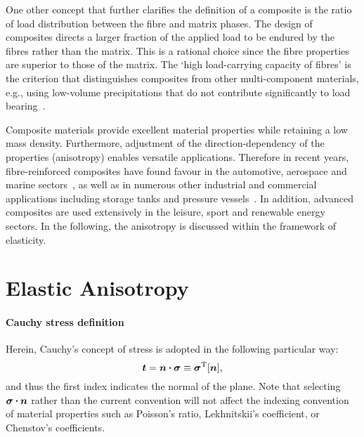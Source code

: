 	One other concept that further clarifies the definition of a composite is the ratio of load distribution between the fibre and matrix phases. The design of composites directs a larger fraction of the applied load to be endured by the fibres rather than the matrix. This is a rational choice since the fibre properties are superior to those of the matrix. The `high load-carrying capacity of fibres' is the criterion that distinguishes composites from other multi-component materials, e.g., using low-volume precipitations that do not contribute significantly to load bearing~\autocite{Clyne.2019}.
		
	Composite materials provide excellent material properties while retaining a low mass density. Furthermore, adjustment of the direction-dependency of the properties (anisotropy) enables versatile applications. Therefore in recent years, fibre-reinforced composites have found favour in the automotive, aerospace and marine sectors~\autocite{Jones.1999}, as well as in numerous other industrial and commercial applications including storage tanks and pressure vessels~\autocite{Vasiliev.2013}. In addition, advanced composites are used extensively in the leisure, sport and renewable energy sectors. In the following, the anisotropy is discussed within the framework of elasticity.


\bl
\section{Elastic Anisotropy}
    \paragraph{Cauchy stress definition} Herein, Cauchy's concept of stress is adopted in the following particular way:
    \begin{equation}
    	\tena{t}=\tena{n}\scp\tenb{\sigma}\equiv \tenb{\sigma}^\tran[\tena{n}],
    \end{equation}
    and thus the first index indicates the normal of the plane. Note that selecting $\tenb{\sigma}\scp\tena{n}$ rather than the current convention will not affect the indexing convention of material properties such as Poisson's ratio, Lekhnitskii's coefficient, or Chenstov's coefficients.
